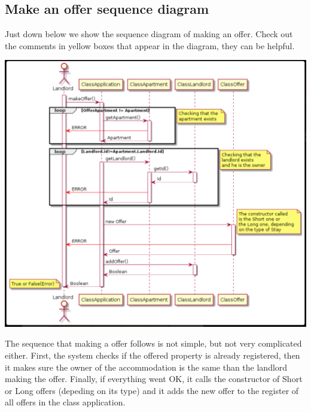 \documentclass[12pt]{article}
\begin{document}
\subsection{Make an offer sequence diagram}
Just down below we show the sequence diagram of making an offer. Check out the comments in yellow boxes that appear in the diagram, they can be helpful.
\begin{center}
	\includegraphics[scale=1]{sequence2.PNG}
\end{center}
The sequence that making a offer follows is not simple, but not very complicated either. First, the system checks if the offered property is already registered, then it makes sure the owner of the accommodation is the same than the landlord making the offer. Finally, if everything went OK, it calls the constructor of Short or Long offers (depeding on its type) and it adds the new offer to the register of all offers in the class application.
\end{document}
